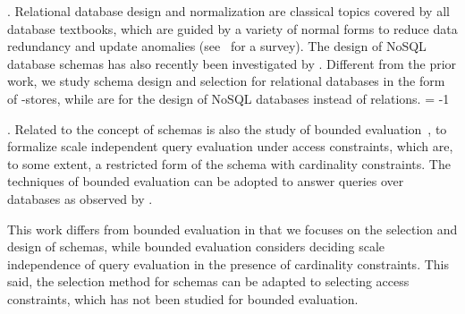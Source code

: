 .
Relational database design and normalization are classical topics
covered by all database textbooks, which are guided by a %
variety of
normal forms to reduce data redundancy and update anomalies
(see~\cite{DBSchema} for a survey). The design of NoSQL database
schemas has also recently been investigated by \eg
\cite{NoSQLschema1,NoSQLschema2}. Different from the
  prior work, we study
schema design and selection for relational databases in the
form of \kv-stores, while \cite{NoSQLschema1,NoSQLschema2} are
for the design of NoSQL databases instead of relations.
\looseness = -1




.
Related to the concept of \baav schemas is also the study of
bounded evaluation~\cite{PODS14,PODS15,SIGMOD16,PODS16}, to
formalize scale independent query evaluation under access
constraints, which are, to some extent, a restricted form of the
\baav schema with cardinality constraints. %
The techniques of bounded evaluation can be adopted to answer
queries over \baav databases as observed by \cite{VLDB19}.

This work differs from bounded evaluation in that we focuses on
the selection and design of \baav schemas, while bounded
evaluation considers deciding scale independence of query
evaluation %
in the presence of cardinality constraints.
This said, the selection method for \baav schemas can be
  adapted to selecting access constraints, which has not been
  studied for bounded evaluation.



